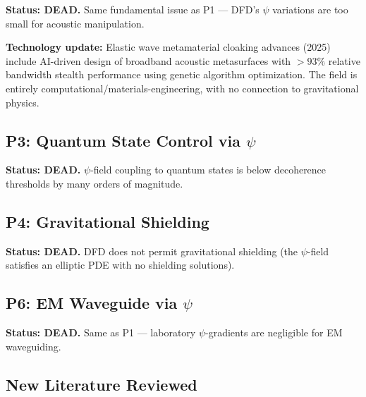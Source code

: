 \documentclass[11pt]{article}
\begin{document}
\textbf{Status: DEAD.} Same fundamental issue as P1 --- DFD's $\psi$
variations are too small for acoustic manipulation.

\textbf{Technology update:} Elastic wave metamaterial cloaking advances
(2025) include AI-driven design of broadband acoustic metasurfaces with
$> 93\%$ relative bandwidth stealth performance using genetic algorithm
optimization. The field is entirely computational/materials-engineering,
with no connection to gravitational physics.

\subsection{P3: Quantum State Control via $\psi$}

\textbf{Status: DEAD.} $\psi$-field coupling to quantum states is
below decoherence thresholds by many orders of magnitude.

\subsection{P4: Gravitational Shielding}

\textbf{Status: DEAD.} DFD does not permit gravitational shielding
(the $\psi$-field satisfies an elliptic PDE with no shielding solutions).

\subsection{P6: EM Waveguide via $\psi$}

\textbf{Status: DEAD.} Same as P1 --- laboratory $\psi$-gradients are
negligible for EM waveguiding.

\subsection{New Literature Reviewed}
\end{document}
